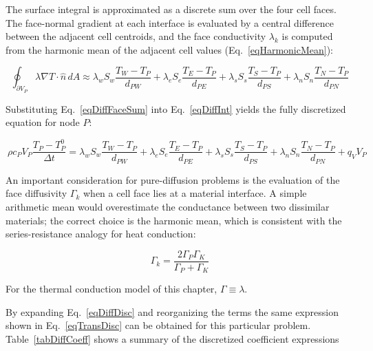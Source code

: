 The surface integral is approximated as a discrete sum over the four cell faces. The face-normal gradient at each interface is evaluated by a central difference between the adjacent cell centroids, and the face conductivity $\lambda_k$ is computed from the harmonic mean of the adjacent cell values (Eq.~\eqref{eqHarmonicMean}):

\begin{equation}~\label{eqDiffFaceSum}
    \oint_{\partial V_P} \lambda \nabla T \cdot \hat{n} \, dA \approx
      \lambda_w S_w \frac{T_W - T_P}{d_{PW}}
    + \lambda_e S_e \frac{T_E - T_P}{d_{PE}}
    + \lambda_s S_s \frac{T_S - T_P}{d_{PS}}
    + \lambda_n S_n \frac{T_N - T_P}{d_{PN}}
\end{equation}

Substituting Eq.~\eqref{eqDiffFaceSum} into Eq.~\eqref{eqDiffInt} yields the fully discretized equation for node $P$:

\begin{equation}~\label{eqDiffDisc}
	\rho c_P V_P \frac{T_P - T^0_P}{\Delta t} = \lambda_w S_w \frac{T_W - T_P}{d_{PW}} + \lambda_e S_e \frac{T_E - T_P}{d_{PE}} + \lambda_s S_s \frac{T_S - T_P}{d_{PS}} + \lambda_n S_n \frac{T_N - T_P}{d_{PN}} + q_V V_P
\end{equation}

An important consideration for pure-diffusion problems is the evaluation of the face diffusivity $\Gamma_k$ when a cell face lies at a material interface. A simple arithmetic mean would overestimate the conductance between two dissimilar materials; the correct choice is the harmonic mean, which is consistent with the series-resistance analogy for heat conduction:

\begin{equation}~\label{eqHarmonicMean}
    \Gamma_k = \frac{2 \Gamma_P \Gamma_K}{\Gamma_P + \Gamma_K}
\end{equation}

For the thermal conduction model of this chapter, $\Gamma \equiv \lambda$.

By expanding Eq.~\eqref{eqDiffDisc} and reorganizing the terms the same expression shown in Eq.~\eqref{eqTransDisc} can be obtained for this particular problem. Table~\ref{tabDiffCoeff} shows a summary of the discretized coefficient expressions

